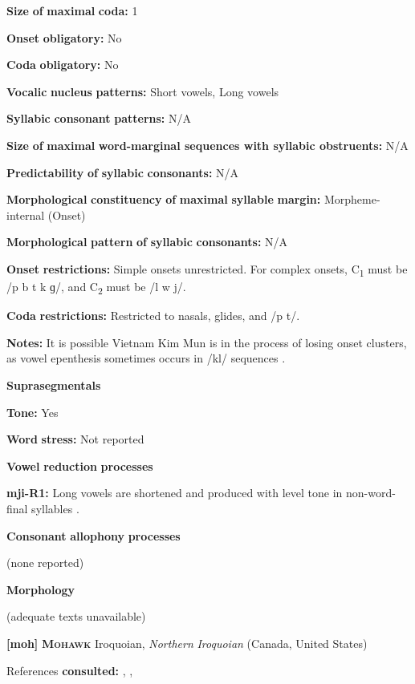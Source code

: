 \begin{styleBody}
\textbf{Size} \textbf{of} \textbf{maximal} \textbf{coda:} 1

\textbf{Onset} \textbf{obligatory:} No

\textbf{Coda} \textbf{obligatory:} No

\textbf{Vocalic} \textbf{nucleus} \textbf{patterns:} Short vowels, Long vowels

\textbf{Syllabic} \textbf{consonant} \textbf{patterns:} N/A

\textbf{Size} \textbf{of} \textbf{maximal} \textbf{word{}-marginal sequences with syllabic obstruents:} N/A

\textbf{Predictability} \textbf{of} \textbf{syllabic} \textbf{consonants:} N/A

\textbf{Morphological} \textbf{constituency} \textbf{of} \textbf{maximal} \textbf{syllable} \textbf{margin:} Morpheme-internal (Onset)

\textbf{Morphological} \textbf{pattern} \textbf{of} \textbf{syllabic} \textbf{consonants:} N/A

\textbf{Onset} \textbf{restrictions:} Simple onsets unrestricted. For complex onsets, C\textsubscript{1} must be /p b t k ɡ/, and C\textsubscript{2} must be /l w j/. 

\textbf{Coda} \textbf{restrictions:} Restricted to nasals, glides, and /p t/.

\textbf{Notes:} It is possible Vietnam Kim Mun is in the process of losing onset clusters, as vowel epenthesis sometimes occurs in /kl/ sequences \citep[127]{Clark2008}.

\textbf{Suprasegmentals}

\textbf{Tone:} Yes

\textbf{Word} \textbf{stress:} Not reported

\textbf{Vowel} \textbf{reduction} \textbf{processes}

\textbf{mji-R1:} Long vowels are shortened and produced with level tone in non-word-final syllables \citep[117]{Clark2008}.

\textbf{Consonant} \textbf{allophony} \textbf{processes}

(none reported)

\textbf{Morphology}

(adequate texts unavailable)

\textbf{[moh]}   \textbf{\textsc{Mohawk}}  Iroquoian, \textit{Northern} \textit{Iroquoian} (Canada, United States)

References \textbf{consulted:} \citet{Bonvillain1973}, \citet{Michelson1981}, \citet{Michelson1988}


\end{styleBody}
